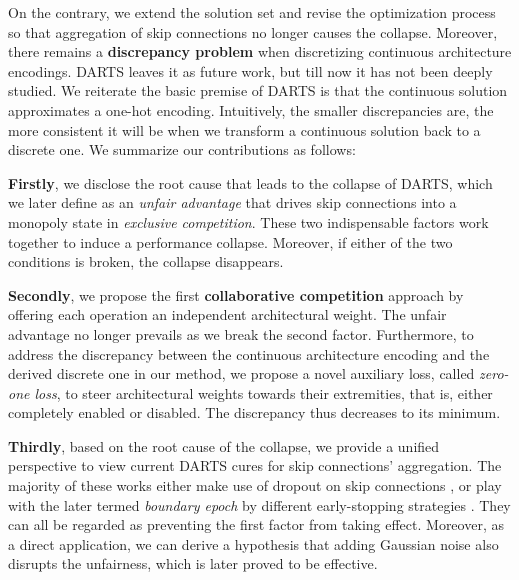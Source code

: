 \documentclass[runningheads]{llncs}
\begin{document}
On the contrary, we extend the solution set and revise the optimization process so that  aggregation of skip connections no longer causes the collapse.  
Moreover, there remains a \textbf{discrepancy problem} when discretizing continuous architecture encodings. DARTS \cite{liu2018darts} leaves it as future work, but till now it has not been deeply studied. We reiterate the basic premise of DARTS is that the continuous solution approximates a one-hot encoding. Intuitively, the smaller discrepancies are, the more consistent it will be when we transform a continuous solution back to a discrete one. We summarize our contributions as follows:







 \textbf{Firstly},  we disclose the root cause that leads to  the collapse of DARTS, which we later define as an \emph{unfair advantage} that drives skip connections into a monopoly state in \emph{exclusive competition}. These two indispensable factors work together to induce a performance collapse. Moreover, if either of the two conditions is broken, the collapse disappears.
 
\textbf{Secondly}, we propose the first \textbf{collaborative competition} approach by offering each operation an independent architectural weight. The unfair advantage no longer prevails as we break the second factor. Furthermore, to address the discrepancy between the continuous architecture encoding and the derived discrete one in our method, we propose a novel auxiliary loss, called \emph{zero-one loss}, to steer architectural weights towards their extremities, that is, either completely enabled or disabled. The discrepancy thus decreases to its minimum. 


 
\textbf{Thirdly},  based on the root cause of the collapse, we provide a unified perspective to view current DARTS cures for skip connections' aggregation. The majority of these works either make use of dropout \cite{srivastava2014dropout} on skip connections \cite{chen2019progressive,zela2020understanding}, or play with the later termed \emph{boundary epoch} by different early-stopping strategies \cite{liang2019darts,zela2020understanding}. They can all be regarded as preventing the first factor from taking effect.
Moreover, as a direct application, we can derive a hypothesis that adding Gaussian noise also disrupts the unfairness, which is later proved to be effective. 
\end{document}
